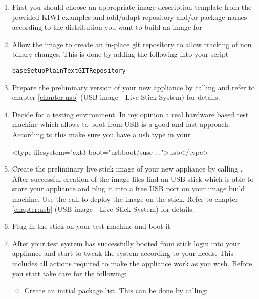 \begin{enumerate}
\item First you should choose an appropriate image description template from
      the provided KIWI examples and add/adapt repository and/or
      package names according to the distribution you want to
      build an image for
\item Allow the image to create an in-place git repository to
      allow tracking of non binary changes. This is done by adding
      the following into your  script

\begin{verbatim}
baseSetupPlainTextGITRepository
\end{verbatim}

\item Prepare the preliminary version of your new appliance by
      calling  and refer to chapter \ref{chapter:usb}
      (USB image - Live-Stick System) for details.
\item Decide for a testing environment. In my opinion a real
      hardware based test machine which allows to boot from USB
      is a good and fast approach. According to this make sure
      you have a usb type in your 

\begin{xml}
<type filesystem="ext3 boot="usbboot/suse-...">usb</type>
\end{xml}

\item Create the preliminary live stick image of your new appliance
      by calling . After successful creation
      of the image files find an USB stick which is able to store
      your appliance and plug it into a free USB port on your image
      build machine. Use the  call to deploy
      the image on the stick. Refer to chapter \ref{chapter:usb}
      (USB image - Live-Stick System) for details.
\item Plug in the stick on your test machine and boot it.
\item After your test system has successfully booted from stick login
      into your appliance and start to tweak the system according to
      your needs. This includes all actions required to make the
      appliance work as you wish. Before you start take care for
      the following:
      \begin{itemize}
      \item Create an initial package list. This can be done by calling:


\end{itemize}
\end{enumerate}
